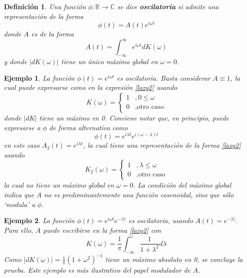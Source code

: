 \documentclass[12pt,letterpaper]{book}
\newtheorem{definicion}{Definición}[chapter]
\newtheorem{ejemplo}{Ejemplo}[chapter]
\newcommand{\R}{\mathbb{R}}
\newcommand{\C}{\mathbb{C}}
\newcommand{\intR}{\int_{-\infty}^{\infty}}
\newcommand{\abso}[1]{\left| #1 \right|}
\begin{document}

\begin{definicion}
Una función $\phi: \R \rightarrow \C$ se dice \textbf{oscilatoria} si admite una representación de la forma
\begin{equation}
\phi(t) = A(t) e^{i \omega t} 
\end{equation}
donde $A$ es de la forma
\begin{equation}
A(t) = \intR e^{i \omega t} dK(\omega)
\label{lazy2}
\end{equation}
y donde $\abso{dK(\omega)}$ tiene un único máximo global en $\omega = 0$.
\label{oscilatorio}
\end{definicion}

\begin{ejemplo}
La función $\phi(t) = e^{i \omega t}$ es oscilatoria. 
%
Basta considerar $A \equiv 1$, la cual puede expresarse como en la expresión \ref{lazy2} usando \begin{equation}
K(\omega) = \begin{cases}
1 &, 0 \leq \omega \\
0 &, \text{otro caso}
\end{cases}
\end{equation}
donde $\abso{dK}$ tiene un máximo en 0. Conviene notar que, en principio, puede expresarse a $\phi$ de forma alternativa como
\begin{equation}
\phi(t) = e^{i \lambda t} e^{i (\omega-\lambda) t}
\end{equation} 
en este caso $A_2(t) = e^{i \lambda t}$, la cual tiene una representación de la forma \ref{lazy2} usando
\begin{equation}
K_2(\omega) = \begin{cases}
1 &, \lambda \leq \omega \\
0 &, \text{otro caso}
\end{cases}
\end{equation}
la cual no tiene un máximo global en $\omega=0$.
%
La condición del máximo global indica que $A$ no es \textit{predominantemente} una función cosenoidal, sino que sólo \textit{`modula'} a $\phi$.
\label{ejemplo:sen_cos_oscilatorios}
\end{ejemplo}

\begin{ejemplo}
La función $\phi(t) = e^{i \omega t} e^{-\abso{t}}$ es oscilatoria, usando $A(t) = e^{-\abso{t}}$.
% 
Para ello, $A$ puede escribirse en la forma \ref{lazy2} con 
\begin{equation}
K(\omega) = \frac{1}{\pi} \int_{-\infty}^{\omega}  \frac{1}{1+\lambda^2} d\lambda
\end{equation}
Como $\abso{dK(\omega)} = \frac{1}{\pi} \left( 1 + \omega^2 \right)^{-1}$ tiene un máximo absoluto en 0, se concluye la prueba. 
%
Este ejemplo es más ilustrativo del papel modulador de $A$.
\label{ejemplo:oscilatorios1}
\end{ejemplo}
\end{document}
